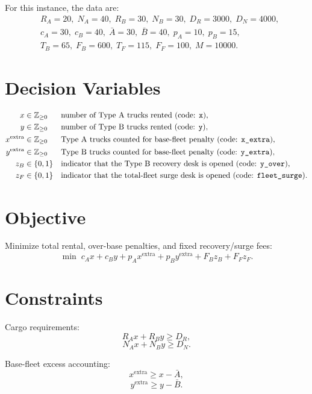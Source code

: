 For this instance, the data are:
\[
\begin{aligned}
&R_A=20,\; N_A=40,\; R_B=30,\; N_B=30,\; D_R=3000,\; D_N=4000,\\
&c_A=30,\; c_B=40,\; \bar A=30,\; \bar B=40,\; p_A=10,\; p_B=15,\\
&T_B=65,\; F_B=600,\; T_F=115,\; F_F=100,\; M=10000.
\end{aligned}
\]

\section*{Decision Variables}

\[
\begin{aligned}
x &\in \mathbb{Z}_{\ge 0} &&\text{number of Type A trucks rented (code: \texttt{x})},\\
y &\in \mathbb{Z}_{\ge 0} &&\text{number of Type B trucks rented (code: \texttt{y})},\\
x^{\text{extra}} &\in \mathbb{Z}_{\ge 0} &&\text{Type A trucks counted for base-fleet penalty (code: \texttt{x\_extra})},\\
y^{\text{extra}} &\in \mathbb{Z}_{\ge 0} &&\text{Type B trucks counted for base-fleet penalty (code: \texttt{y\_extra})},\\
z_B &\in \{0,1\} &&\text{indicator that the Type B recovery desk is opened (code: \texttt{y\_over})},\\
z_F &\in \{0,1\} &&\text{indicator that the total-fleet surge desk is opened (code: \texttt{fleet\_surge})}.
\end{aligned}
\]

\section*{Objective}

Minimize total rental, over-base penalties, and fixed recovery/surge fees:
\[
\min\;
c_A x + c_B y + p_A x^{\text{extra}} + p_B y^{\text{extra}} + F_B z_B + F_F z_F.
\]

\section*{Constraints}

Cargo requirements:
\[
R_A x + R_B y \ge D_R,
\]
\[
N_A x + N_B y \ge D_N.
\]

Base-fleet excess accounting:
\[
x^{\text{extra}} \ge x - \bar A,
\]
\[
y^{\text{extra}} \ge y - \bar B.
\]

